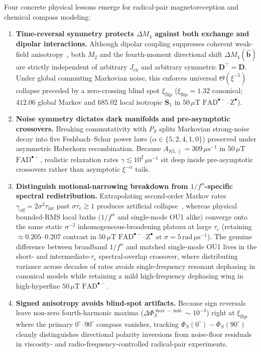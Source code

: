 \documentclass[twocolumn,10pt,amsmath,amssymb,floatfix]{revtex4-2}
\theoremstyle{plain}
\theoremstyle{definition}
\newcommand{\PS}{P_S}
\newcommand{\DeltaPhi}{\Delta\Phi_S}
\newcommand{\xiflip}{\xi_{\mathrm{flip}}}
\begin{document}
Four concrete physical lessons emerge for radical-pair magnetoreception and chemical compass modeling:
\begin{enumerate}[leftmargin=1.4em,itemsep=0.5pt,topsep=2pt,parsep=0pt]
\item \textbf{Time-reversal symmetry protects $\Delta M_4$ against both exchange and dipolar interactions.} Although dipolar coupling suppresses coherent weak-field anisotropy~\cite{Efimova2008BJ,Babcock2020JPCL}, both $M_2$ and the fourth-moment directional shift $\Delta M_4(\hat{\mathbf{b}})$ are strictly independent of arbitrary $J_{\mathrm{ex}}$ and arbitrary symmetric $\mathbf{D}^\top = \mathbf{D}$. Under global commuting Markovian noise, this enforces universal $\Theta(\xi^{-5})$ collapse preceded by a zero-crossing blind spot $\xiflip$ ($\xiflip = 1.32$ canonical; $412.06$ global Markov and $685.02$ local isotropic $\mathbf{S}_1$ in $50\,\mu\text{T}$ $\mathrm{FAD}^{\bullet-}\text{--}\mathrm{Z}^{\bullet}$).
\item \textbf{Noise symmetry dictates dark manifolds and pre-asymptotic crossovers.} Breaking commutativity with $\PS$ splits Markovian strong-noise decay into five Feshbach--Schur power laws ($\alpha \in \{5, 2, 4, 1, 0\}$) preserved under asymmetric Haberkorn recombination. Because $A_{\mathrm{N5},\parallel} = 309\,\mu\text{s}^{-1}$ in $50\,\mu\text{T}$ $\mathrm{FAD}^{\bullet-}$, realistic relaxation rates $\gamma \lesssim 10^2\,\mu\text{s}^{-1}$ sit deep inside pre-asymptotic crossovers rather than asymptotic $\xi^{-\alpha}$ tails.
\item \textbf{Distinguish motional-narrowing breakdown from $1/f^\alpha$-specific spectral redistribution.} Extrapolating second-order Markov rates $\gamma_{\mathrm{eff}} = 2\sigma^2\tau_{\mathrm{int}}$ past $\sigma\tau_c \gtrsim 1$ produces artificial collapse~\cite{Fay2019JCP}, whereas physical bounded-RMS local baths ($1/f^\alpha$ and single-mode OU1 alike) converge onto the same static $\sigma^{-2}$ inhomogeneous-broadening plateau at large $\tau_c$ (retaining $\approx 0.205\text{--}0.207$ contrast in $50\,\mu\text{T}$ $\mathrm{FAD}^{\bullet-}\text{--}\mathrm{Z}^{\bullet}$ at $\sigma = 5\,\text{rad}\,\mu\text{s}^{-1}$). The genuine difference between broadband $1/f^\alpha$ and matched single-mode OU1 lives in the short- and intermediate-$\tau_c$ spectral-overlap crossover, where distributing variance across decades of rates avoids single-frequency resonant dephasing in canonical models while retaining a mild high-frequency dephasing wing in high-hyperfine $50\,\mu\text{T}$ $\mathrm{FAD}^{\bullet-}$.
\item \textbf{Signed anisotropy avoids blind-spot artifacts.} Because sign reversals leave non-zero fourth-harmonic maxima ($\DeltaPhi^{\max-\min} \sim 10^{-3}$) right at $\xiflip$ where the primary $0^\circ\text{--}90^\circ$ compass vanishes, tracking $\Phi_S(0^\circ)-\Phi_S(90^\circ)$ cleanly distinguishes directional polarity inversions from noise-floor residuals in viscosity- and radio-frequency-controlled radical-pair experiments.
\end{enumerate}
\end{document}
